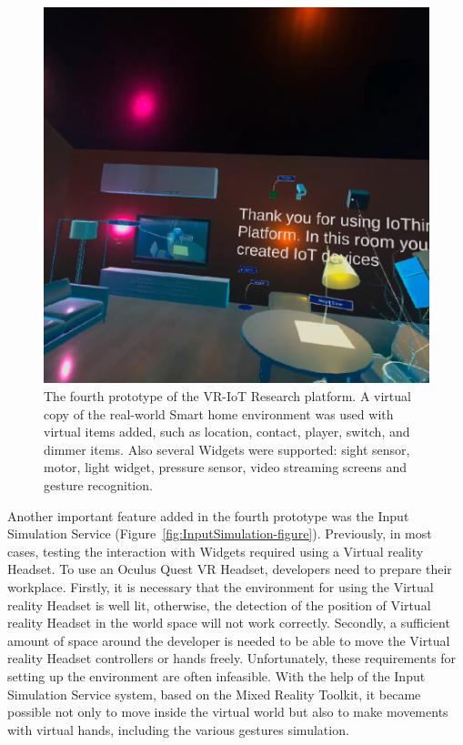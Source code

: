 \begin{figure}
  \centering
  \includegraphics[width=0.6\linewidth]{figures/Prototype4.png}
  \caption{The fourth prototype of the VR-IoT Research platform. A virtual copy of the real-world Smart home environment was used with virtual items added, such as location, contact, player, switch, and dimmer items. Also several Widgets were supported: sight sensor, motor, light widget, pressure sensor, video streaming screens and gesture recognition.}
  \label{fig:Prototype4-figure}
\end{figure}

Another important feature added in the fourth prototype was the Input Simulation Service (Figure~\ref{fig:InputSimulation-figure}). Previously, in most cases, testing the interaction with Widgets required using a Virtual reality Headset. To use an Oculus Quest VR Headset, developers need to prepare their workplace. Firstly, it is necessary that the environment for using the Virtual reality Headset is well lit, otherwise, the detection of the position of Virtual reality Headset in the world space will not work correctly. Secondly, a sufficient amount of space around the developer is needed to be able to move the Virtual reality Headset controllers or hands freely. Unfortunately, these requirements for setting up the environment are often infeasible. With the help of the Input Simulation Service system, based on the Mixed Reality Toolkit, it became possible not only to move inside the virtual world but also to make movements with virtual hands, including the various gestures simulation.

